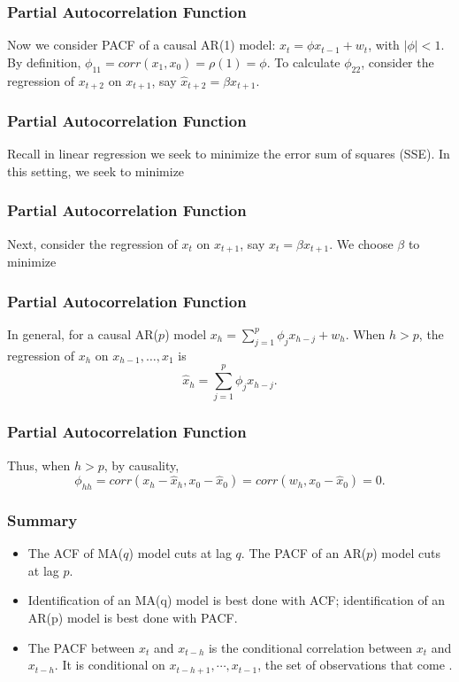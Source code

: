 \documentclass[%
xcolor=pdftex]{beamer}
\begin{document}
\begin{frame}
\frametitle{Partial Autocorrelation Function}

Now we consider PACF of a causal AR(1) model: $x_t=\phi
x_{t-1}+w_t$, with $|\phi|<1$. By definition,
$\phi_{11}=corr(x_1,x_0)=\rho(1)=\phi$. To calculate
$\phi_{22}$, consider the regression of $x_{t+2}$ on $x_{t+1}$, say
$\hat{x}_{t+2}=\beta x_{t+1}$.

\end{frame}

\begin{frame}
\frametitle{Partial Autocorrelation Function}

Recall in linear regression we seek to minimize the error sum of squares (SSE). In this setting, we seek to minimize

\vspace{50mm}

\end{frame}

\begin{frame}
\frametitle{Partial Autocorrelation Function}

Next, consider the regression of $x_t$ on $x_{t+1}$, say
$\hat{x}_t=\beta x_{t+1}$. We choose $\beta$ to minimize
\vspace{50mm}

\end{frame}

\begin{frame}
\frametitle{Partial Autocorrelation Function}

In general, for a causal AR($p$) model $x_h=\sum^p_{j=1}\phi_j
x_{h-j}+w_h$. When $h>p$, the regression of $x_h$ on
$x_{h-1},\ldots,x_1$ is
$$
\hat{x}_{h} = \sum^p_{j=1} \phi_j x_{h-j}.
$$

\end{frame}

\begin{frame}
\frametitle{Partial Autocorrelation Function}

Thus, when $h>p$, by causality,
$$
\phi_{hh} = corr(x_h-\hat{x}_{h},x_0-\hat{x}_{0}) = corr(w_h,x_0-\hat{x}_{0}) = 0.
$$

\end{frame}

\begin{frame}
\frametitle{Summary}

\begin{itemize}
\item The ACF of MA($q$) model cuts at lag $q$. The PACF of an AR($p$) model cuts at lag $p$.
\item Identification of an MA(q) model is best done with ACF; identification of an AR(p) model is best done with PACF.
\item The PACF between $x_t$ and $x_{t-h}$ is the conditional correlation between $x_t$ and $x_{t-h}$. It is conditional on $x_{t-h+1}, \cdots, x_{t-1}$, the set of observations that come \underline{\hspace{40 mm}}.
\end{itemize}

\end{frame}
\end{document}

